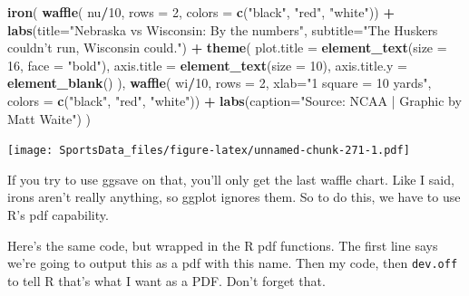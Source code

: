\documentclass[]{book}
\newenvironment{Shaded}{\begin{snugshade}}{\end{snugshade}}
\newcommand{\DataTypeTok}[1]{\textcolor[rgb]{0.13,0.29,0.53}{#1}}
\newcommand{\DecValTok}[1]{\textcolor[rgb]{0.00,0.00,0.81}{#1}}
\newcommand{\KeywordTok}[1]{\textcolor[rgb]{0.13,0.29,0.53}{\textbf{#1}}}
\newcommand{\NormalTok}[1]{#1}
\newcommand{\OperatorTok}[1]{\textcolor[rgb]{0.81,0.36,0.00}{\textbf{#1}}}
\newcommand{\StringTok}[1]{\textcolor[rgb]{0.31,0.60,0.02}{#1}}
\begin{document}
\begin{Shaded}
\begin{Highlighting}[]
\KeywordTok{iron}\NormalTok{(}
 \KeywordTok{waffle}\NormalTok{(}
\NormalTok{   nu}\OperatorTok{/}\DecValTok{10}\NormalTok{, }
   \DataTypeTok{rows =} \DecValTok{2}\NormalTok{, }
   \DataTypeTok{colors =} \KeywordTok{c}\NormalTok{(}\StringTok{"black"}\NormalTok{, }\StringTok{"red"}\NormalTok{, }\StringTok{"white"}\NormalTok{)) }\OperatorTok{+}\StringTok{ }
\StringTok{   }\KeywordTok{labs}\NormalTok{(}\DataTypeTok{title=}\StringTok{"Nebraska vs Wisconsin: By the numbers"}\NormalTok{, }\DataTypeTok{subtitle=}\StringTok{"The Huskers couldn't run, Wisconsin could."}\NormalTok{) }\OperatorTok{+}\StringTok{ }
\StringTok{   }\KeywordTok{theme}\NormalTok{(}
    \DataTypeTok{plot.title =} \KeywordTok{element_text}\NormalTok{(}\DataTypeTok{size =} \DecValTok{16}\NormalTok{, }\DataTypeTok{face =} \StringTok{"bold"}\NormalTok{),}
    \DataTypeTok{axis.title =} \KeywordTok{element_text}\NormalTok{(}\DataTypeTok{size =} \DecValTok{10}\NormalTok{),}
    \DataTypeTok{axis.title.y =} \KeywordTok{element_blank}\NormalTok{()}
\NormalTok{  ),}
 \KeywordTok{waffle}\NormalTok{(}
\NormalTok{   wi}\OperatorTok{/}\DecValTok{10}\NormalTok{, }
   \DataTypeTok{rows =} \DecValTok{2}\NormalTok{, }
   \DataTypeTok{xlab=}\StringTok{"1 square = 10 yards"}\NormalTok{, }
   \DataTypeTok{colors =} \KeywordTok{c}\NormalTok{(}\StringTok{"black"}\NormalTok{, }\StringTok{"red"}\NormalTok{, }\StringTok{"white"}\NormalTok{)) }\OperatorTok{+}\StringTok{ }\KeywordTok{labs}\NormalTok{(}\DataTypeTok{caption=}\StringTok{"Source: NCAA | Graphic by Matt Waite"}\NormalTok{)}
\NormalTok{) }
\end{Highlighting}
\end{Shaded}

\texttt{[image: SportsData\_files/figure-latex/unnamed-chunk-271-1.pdf]}

If you try to use ggsave on that, you'll only get the last waffle chart. Like I said, irons aren't really anything, so ggplot ignores them. So to do this, we have to use R's pdf capability.

Here's the same code, but wrapped in the R pdf functions. The first line says we're going to output this as a pdf with this name. Then my code, then \texttt{dev.off} to tell R that's what I want as a PDF. Don't forget that.
\end{document}
